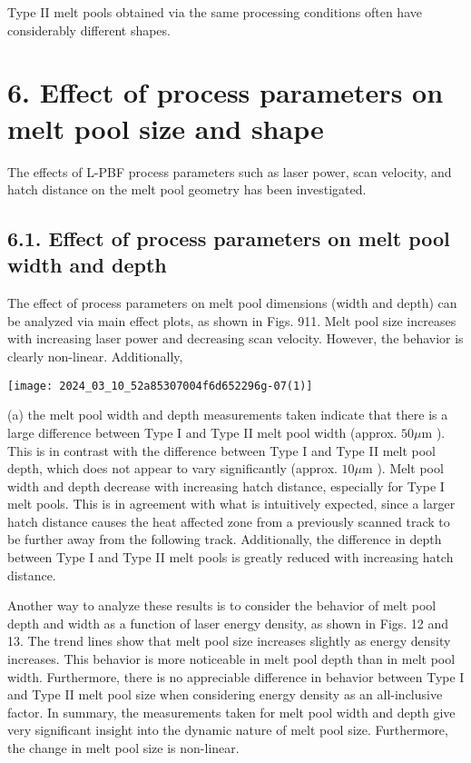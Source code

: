 \documentclass[10pt]{article}
\begin{document}
Type II melt pools obtained via the same processing conditions often have considerably different shapes.

\section*{6. Effect of process parameters on melt pool size and shape}
The effects of L-PBF process parameters such as laser power, scan velocity, and hatch distance on the melt pool geometry has been investigated.

\subsection*{6.1. Effect of process parameters on melt pool width and depth}
The effect of process parameters on melt pool dimensions (width and depth) can be analyzed via main effect plots, as shown in Figs. 911. Melt pool size increases with increasing laser power and decreasing scan velocity. However, the behavior is clearly non-linear. Additionally,

\begin{center}
\texttt{[image: 2024\_03\_10\_52a85307004f6d652296g-07(1)]}
\end{center}

(a) the melt pool width and depth measurements taken indicate that there is a large difference between Type I and Type II melt pool width (approx. $50 \mu \mathrm{m}$ ). This is in contrast with the difference between Type I and Type II melt pool depth, which does not appear to vary significantly (approx. $10 \mu \mathrm{m}$ ). Melt pool width and depth decrease with increasing hatch distance, especially for Type I melt pools. This is in agreement with what is intuitively expected, since a larger hatch distance causes the heat affected zone from a previously scanned track to be further away from the following track. Additionally, the difference in depth between Type I and Type II melt pools is greatly reduced with increasing hatch distance.

Another way to analyze these results is to consider the behavior of melt pool depth and width as a function of laser energy density, as shown in Figs. 12 and 13. The trend lines show that melt pool size increases slightly as energy density increases. This behavior is more noticeable in melt pool depth than in melt pool width. Furthermore, there is no appreciable difference in behavior between Type I and Type II melt pool size when considering energy density as an all-inclusive factor. In summary, the measurements taken for melt pool width and depth give very significant insight into the dynamic nature of melt pool size. Furthermore, the change in melt pool size is non-linear.
\end{document}
